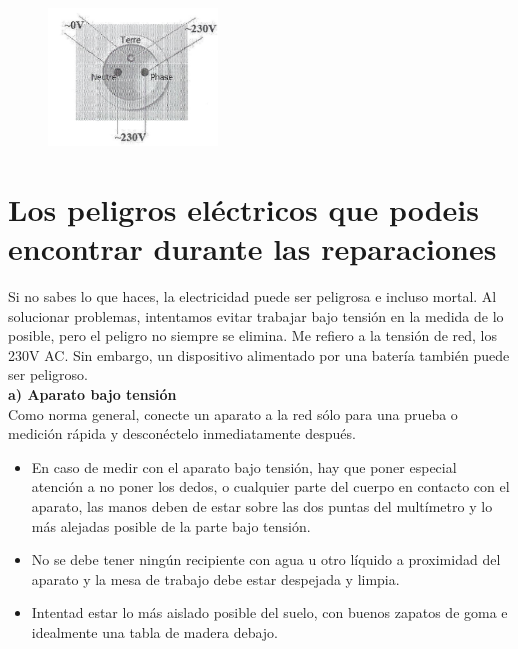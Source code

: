 \documentclass[a5paper,twoside,openany]{book}
\begin{document}
\begin{figure}[h]
\includegraphics[width=0.4\textwidth]{diagrama-enchufe} 
\centering
\end{figure}
\section{Los peligros eléctricos que podeis encontrar durante las reparaciones}
Si no sabes lo que haces, la electricidad puede ser peligrosa e incluso mortal.
Al solucionar problemas, intentamos evitar trabajar bajo tensión en la medida de lo posible, pero el peligro no siempre se elimina. Me refiero a la tensión de red, los 230V AC. Sin embargo, un dispositivo alimentado por una batería también puede ser peligroso.\\

\textbf{a) Aparato bajo tensión}\\

Como norma general, conecte un aparato a la red sólo para una prueba o medición rápida y desconéctelo inmediatamente después.

\begin{itemize}
\item En caso de medir con el aparato bajo tensión, hay que poner especial atención a no poner los dedos, o cualquier parte del cuerpo en contacto con el aparato, las manos deben de estar sobre las dos puntas del multímetro y lo más alejadas posible de la parte bajo tensión.
\item No se debe tener ningún recipiente con agua u otro líquido a proximidad del aparato y la mesa de trabajo debe estar despejada y limpia.
\item Intentad estar lo más aislado posible del suelo, con buenos zapatos de goma e idealmente una tabla de madera debajo.
\end{itemize}
\newpage
\end{document}
